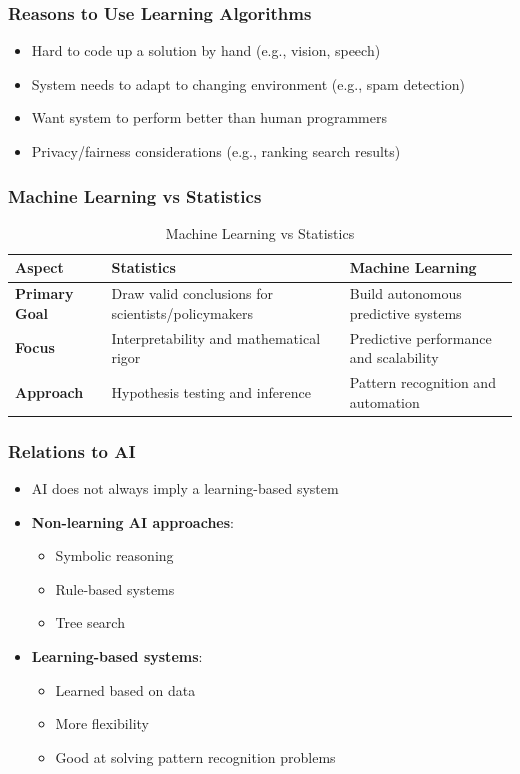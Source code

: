 \subsubsection{Reasons to Use Learning Algorithms}

\begin{itemize}
\item Hard to code up a solution by hand (e.g., vision, speech)
\item System needs to adapt to changing environment (e.g., spam detection)
\item Want system to perform better than human programmers
\item Privacy/fairness considerations (e.g., ranking search results)
\end{itemize}

\subsubsection{Machine Learning vs Statistics}

\begin{table}[h!]
\centering
\begin{tabular}{|l|l|l|}
\hline
\textbf{Aspect} & \textbf{Statistics} & \textbf{Machine Learning} \\
\hline
\textbf{Primary Goal} & Draw valid conclusions for scientists/policymakers & Build autonomous predictive systems \\
\hline
\textbf{Focus} & Interpretability and mathematical rigor & Predictive performance and scalability \\
\hline
\textbf{Approach} & Hypothesis testing and inference & Pattern recognition and automation \\
\hline
\end{tabular}
\caption{Machine Learning vs Statistics}
\end{table}

\subsubsection{Relations to AI}

\begin{itemize}
\item AI does not always imply a learning-based system
\item \textbf{Non-learning AI approaches}:
\begin{itemize}
\item Symbolic reasoning
\item Rule-based systems
\item Tree search
\end{itemize}
\item \textbf{Learning-based systems}:
\begin{itemize}
\item Learned based on data
\item More flexibility
\item Good at solving pattern recognition problems
\end{itemize}
\end{itemize}

